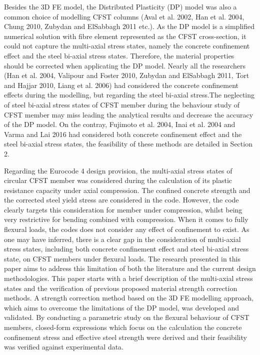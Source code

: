 Besides the 3D FE model, the Distributed Plasticity (DP) model was also a common choice of modelling CFST columns (Aval et al. 2002, Han et al. 2004, Chung 2010, Zubydan and ElSabbagh 2011 etc.). As the DP model is a simplified numerical solution with fibre element represented as the CFST cross-section, it could not capture the multi-axial stress states, namely the concrete confinement effect and the steel bi-axial stress states. Therefore, the material properties should be corrected when applicating the DP model. Nearly all the researchers (Han et al. 2004, Valipour and Foster 2010, Zubydan and ElSabbagh 2011, Tort and Hajjar 2010, Liang et al. 2006) had considered the concrete confinement effects during the modelling, but regarding the steel bi-axial stress.The neglecting of steel bi-axial stress states of CFST member during the behaviour study of CFST member may miss leading the analytical results and decrease the accuracy of the DP model. On the contray, Fujimoto et al. 2004, Inai et al. 2004 and Varma and Lai 2016 had considered both concrete confinement effect and the steel bi-axial stress states, the feasibility of these methods are detailed in Section 2.

Regarding the Eurocode 4 design provision, the multi-axial stress states of circular CFST member was considered during the calculation of its plastic resistance capacity under axial compression. The confined concrete strength and the corrected steel yield stress are considered in the code. However, the code clearly targets this consideration for member under compression, whilst being very restrictive for bending combined with compression. When it comes to fully flexural loads, the codes does not consider any effect of confinement to exist.   
As one may have inferred, there is a clear gap in the consideration of multi-axial stress states, including both concrete confinement effect and steel bi-axial stress state, on CFST members under flexural loads. The research presented in this paper aims to address this limitation of both the literature and the current design methodologies. This paper starts with a brief description of the multi-axial stress states and the verification of previous proposed material strength correction methods. A strength correction method based on the 3D FE modelling approach, which aims to overcome the limitations of the DP model, was developed and validated. By conducting a parametric study on the flexural behaviour of CFST members, closed-form expressions which focus on the calculation the concrete confinement stress and effective steel strength were derived and their feasibility was verified against experimental data. 
